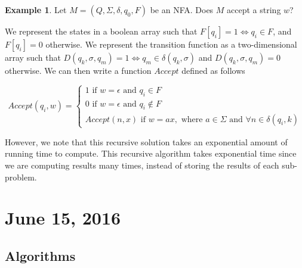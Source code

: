 \documentclass[11pt]{article}
\theoremstyle{plain} %
\theoremstyle{definition}
\theoremstyle{example}
\newtheorem*{example}{Example}
\theoremstyle{remark}
\begin{document}
\begin{example}
Let $M = (Q, \Sigma, \delta,q_0, F)$ be an NFA. Does $M$ accept a string $w$? 
\end{example}

We represent the states in a boolean array such that $F[q_i] = 1 \iff q_i \in F$, and $F[q_i] = 0$ otherwise. We represent the transition function as a two-dimensional array such that $D(q_k, \sigma, q_m) = 1 \iff q_m \in \delta(q_k, \sigma)$ and $D(q_k, \sigma, q_m) = 0$ otherwise. We can then write a function $Accept$ defined as follows 

$$Accept(q_i, w) = \begin{cases}
	1	\text{ if } w  = \epsilon \text{ and } q_i \in F\\
	0 	\text{ if } w = \epsilon  \text{ and } q_i \notin F\\
	Accept(n, x)	\text{ if } w = ax, \text{ where }a \in \Sigma \text{ and } \forall n \in \delta(q_i, k)
	
\end{cases}
$$

However, we note that this recursive solution takes an exponential amount of running time to compute. This recursive algorithm takes exponential time since we are computing results many times, instead of storing the results of each sub-problem. 

\section{June 15, 2016}

\subsection{Algorithms}
\end{document}
